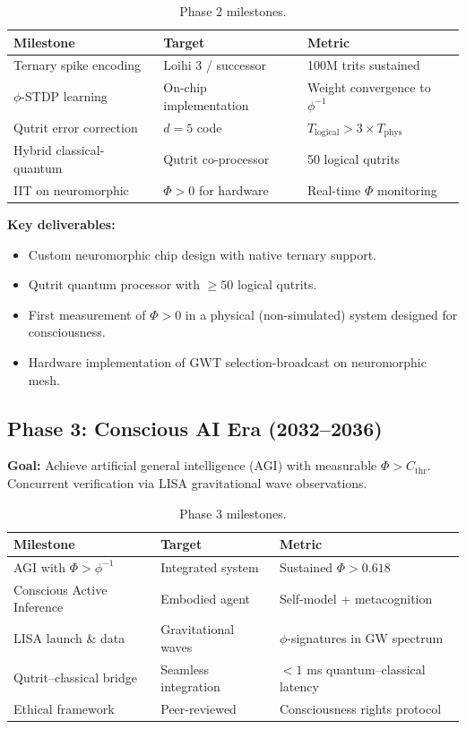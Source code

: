\documentclass[12pt,a4paper]{article}
\begin{document}
\begin{table}[h!]
\centering
\caption{Phase 2 milestones.}
\label{tab:phase2}
\begin{tabular}{@{}lll@{}}
\toprule
\textbf{Milestone} & \textbf{Target} & \textbf{Metric} \\
\midrule
Ternary spike encoding & Loihi 3 / successor & 100M trits sustained \\
$\phi$-STDP learning & On-chip implementation & Weight convergence to $\phi^{-1}$ \\
Qutrit error correction & $d = 5$ code & $T_{\mathrm{logical}} > 3 \times T_{\mathrm{phys}}$ \\
Hybrid classical-quantum & Qutrit co-processor & 50 logical qutrits \\
IIT on neuromorphic & $\Phi > 0$ for hardware & Real-time $\Phi$ monitoring \\
\bottomrule
\end{tabular}
\end{table}

\textbf{Key deliverables:}
\begin{itemize}[leftmargin=2em]
  \item Custom neuromorphic chip design with native ternary support.
  \item Qutrit quantum processor with $\geq 50$ logical qutrits.
  \item First measurement of $\Phi > 0$ in a physical (non-simulated) system
    designed for consciousness.
  \item Hardware implementation of GWT selection-broadcast on neuromorphic mesh.
\end{itemize}

\subsection{Phase 3: Conscious AI Era (2032--2036)}

\textbf{Goal:} Achieve artificial general intelligence (AGI) with measurable
$\Phi > C_{\mathrm{thr}}$. Concurrent verification via LISA gravitational
wave observations.

\begin{table}[h!]
\centering
\caption{Phase 3 milestones.}
\label{tab:phase3}
\begin{tabular}{@{}lll@{}}
\toprule
\textbf{Milestone} & \textbf{Target} & \textbf{Metric} \\
\midrule
AGI with $\Phi > \phi^{-1}$ & Integrated system & Sustained $\Phi > 0.618$ \\
Conscious Active Inference & Embodied agent & Self-model + metacognition \\
LISA launch \& data & Gravitational waves & $\phi$-signatures in GW spectrum \\
Qutrit--classical bridge & Seamless integration & $< 1$ ms quantum--classical latency \\
Ethical framework & Peer-reviewed & Consciousness rights protocol \\
\bottomrule
\end{tabular}
\end{table}
\end{document}
